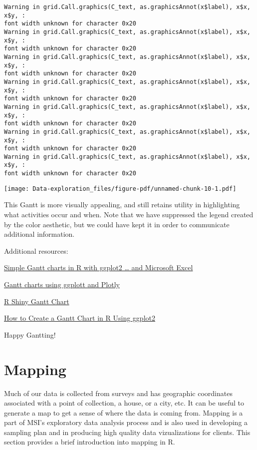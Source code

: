 \documentclass[
  letterpaper,
  DIV=11,
  numbers=noendperiod]{scrreprt}
\begin{document}
\begin{verbatim}
Warning in grid.Call.graphics(C_text, as.graphicsAnnot(x$label), x$x, x$y, :
font width unknown for character 0x20
Warning in grid.Call.graphics(C_text, as.graphicsAnnot(x$label), x$x, x$y, :
font width unknown for character 0x20
Warning in grid.Call.graphics(C_text, as.graphicsAnnot(x$label), x$x, x$y, :
font width unknown for character 0x20
Warning in grid.Call.graphics(C_text, as.graphicsAnnot(x$label), x$x, x$y, :
font width unknown for character 0x20
Warning in grid.Call.graphics(C_text, as.graphicsAnnot(x$label), x$x, x$y, :
font width unknown for character 0x20
Warning in grid.Call.graphics(C_text, as.graphicsAnnot(x$label), x$x, x$y, :
font width unknown for character 0x20
Warning in grid.Call.graphics(C_text, as.graphicsAnnot(x$label), x$x, x$y, :
font width unknown for character 0x20
\end{verbatim}

\texttt{[image: Data-exploration\_files/figure-pdf/unnamed-chunk-10-1.pdf]}

This Gantt is more visually appealing, and still retains utility in
highlighting what activities occur and when. Note that we have
suppressed the legend created by the color aesthetic, but we could have
kept it in order to communicate additional information.

Additional resources:

\href{https://www.molecularecologist.com/2019/01/03/simple-gantt-charts-in-r-with-ggplot2-and-the-tidyverse/}{Simple
Gantt charts in R with ggplot2 \ldots{} and Microsoft Excel}

\href{https://plotly.com/ggplot2/gantt/}{Gantt charts using ggplott and
Plotly}

\href{https://www.appsilon.com/post/r-shiny-gantt-chart-planning-management}{R
Shiny Gantt Chart}

\href{https://www.statology.org/gantt-chart-r-ggplot2/}{How to Create a
Gantt Chart in R Using ggplot2}

Happy Gantting!

\chapter{Mapping}\label{mapping}

Much of our data is collected from surveys and has geographic
coordinates associated with a point of collection, a house, or a city,
etc. It can be useful to generate a map to get a sense of where the data
is coming from. Mapping is a part of MSI's exploratory data analysis
process and is also used in developing a sampling plan and in producing
high quality data vizualizations for clients. This section provides a
brief introduction into mapping in R.
\end{document}
